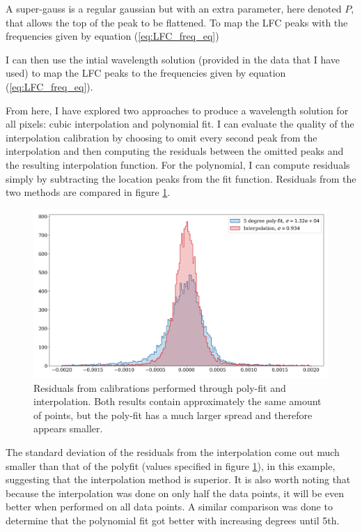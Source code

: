     A super-gauss is a regular gaussian but with an extra parameter, here denoted $P$, that allows the top of the peak to be flattened. To map the LFC peaks with the frequencies given by equation (\ref{eq:LFC_freq_eq})

    I can then use the intial wavelength solution (provided in the data that I have used) to map the LFC peaks to the frequencies given by equation (\ref{eq:LFC_freq_eq}). 

    From here, I have explored two approaches to produce a wavelength solution for all pixels: cubic interpolation and polynomial fit. I can evaluate the quality of the interpolation calibration by choosing to omit every second peak from the interpolation and then computing the residuals between the omitted peaks and the resulting interpolation function. For the polynomial, I can compute residuals simply by subtracting the location peaks from the fit function. Residuals from the two methods are compared in figure \ref{fig:calib_poly_vs_interp}.

    \begin{figure}[ht]
        \centering
        \includegraphics[scale=0.40]{figures/hist_peak_residuals_poly_and_interp.png}
        \caption{Residuals from calibrations performed through poly-fit and interpolation. Both results contain approximately the same amount of points, but the poly-fit has a much larger spread and therefore appears smaller.  }
        \label{fig:calib_poly_vs_interp}
    \end{figure}

    The standard deviation of the residuals from the interpolation come out much smaller than that of the polyfit (values specified in figure \ref{fig:calib_poly_vs_interp}), in this example, suggesting that the interpolation method is superior. It is also worth noting that because the interpolation was done on only half the data points, it will be even better when performed on all data points. A similar comparison was done to determine that the polynomial fit got better with increasing degrees until 5th. 

